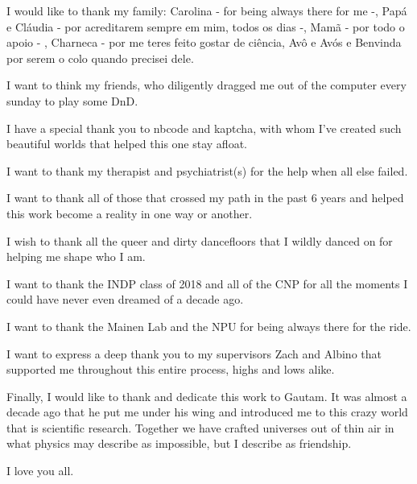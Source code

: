 \documentclass[11pt]{article}
\begin{document}
I would like to thank my family: Carolina - for being always there for me -, Papá e Cláudia - por acreditarem sempre em mim, todos os dias -,  Mamã - por todo o apoio - , Charneca - por me teres feito gostar de ciência, Avô e Avós e Benvinda por serem o colo quando precisei dele.

I want to think my friends, who diligently dragged me out of the computer every sunday to play some DnD.

I have a special thank you to nbcode and kaptcha, with whom I've created such beautiful worlds that helped this one stay afloat.

I want to thank my therapist and psychiatrist(s) for the help when all else failed.

I want to thank all of those that crossed my path in the past 6 years and helped this work become a reality in one way or another.

I wish to thank all the queer and dirty dancefloors that I wildly danced on for helping me shape who I am.

I want to thank the INDP class of 2018 and all of the CNP for all the moments I could have never even dreamed of a decade ago.

I want to thank the Mainen Lab and the NPU for being always there for the ride.

I want to express a deep thank you to my supervisors Zach and Albino that supported me throughout this entire process, highs and lows alike.

Finally, I would like to thank and dedicate this work to Gautam. It was almost a decade ago that he put me under his wing and introduced me to this crazy world that is scientific research. Together we have crafted universes out of thin air in what physics may describe as impossible, but I describe as friendship.

I love you all.



\clearpage
\end{document}
